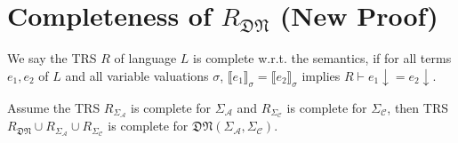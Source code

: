 \documentclass[manuscript, review, timestamp]{acmart}
\newcommand*{\sem}[1]{\llbracket #1 \rrbracket}
\begin{document}
\section{Completeness of $R_\mathfrak{DN}$ (New Proof)}

\begin{definition}[completeness]
  We say the TRS $R$ of language $L$ is complete w.r.t. the semantics, if for all terms $e_1, e_2$ of $L$ and all variable valuations $\sigma$, $\sem{e_1}_\sigma = \sem{e_2}_\sigma$ implies $R \vdash e_1 \downarrow = e_2 \downarrow$.
\end{definition}

\begin{theorem}
  Assume the TRS $R_{\Sigma_\mathcal{A}}$ is complete for $\Sigma_\mathcal{A}$ and $R_{\Sigma_\mathcal{C}}$ is complete for $\Sigma_\mathcal{C}$, then TRS $R_\mathfrak{DN}\cup R_{\Sigma_\mathcal{A}} \cup R_{\Sigma_\mathcal{C}}$ is complete for $\mathfrak{DN}(\Sigma_\mathcal{A}, \Sigma_\mathcal{C})$.
\end{theorem}
\end{document}
